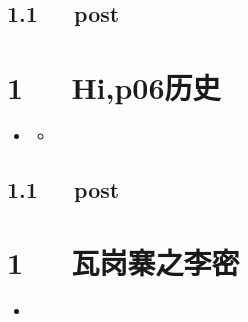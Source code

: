 \documentclass[letterpaper,12pt,english]{sphinxmanual}
\begin{document}
\section{1.1   post}
\label{\detokenize{p05_u6280_u672f/Hello_uff0cp05_u6280_u672f:post}}

\chapter{1   Hi,p06历史}
\label{\detokenize{p06_u5386_u53f2/Hello_uff0cp06_u5386_u53f2:hi-p06}}\label{\detokenize{p06_u5386_u53f2/Hello_uff0cp06_u5386_u53f2::doc}}
\begin{sphinxShadowBox}
\begin{itemize}
\item {} 
\label{\detokenize{p06_u5386_u53f2/Hello_uff0cp06_u5386_u53f2:id2}}{\hyperref[\detokenize{p06_u5386_u53f2/Hello_uff0cp06_u5386_u53f2:hi-p06}]{}}
\begin{itemize}
\item {} 
\label{\detokenize{p06_u5386_u53f2/Hello_uff0cp06_u5386_u53f2:id3}}{\hyperref[\detokenize{p06_u5386_u53f2/Hello_uff0cp06_u5386_u53f2:post}]{}}

\end{itemize}

\end{itemize}
\end{sphinxShadowBox}


\section{1.1   post}
\label{\detokenize{p06_u5386_u53f2/Hello_uff0cp06_u5386_u53f2:post}}

\chapter{1   瓦岗寨之李密}
\label{\detokenize{p06_u5386_u53f2/_u74e6_u5c97_u5be8_u4e4b_u674e_u5bc6:id1}}\label{\detokenize{p06_u5386_u53f2/_u74e6_u5c97_u5be8_u4e4b_u674e_u5bc6::doc}}
\begin{sphinxShadowBox}
\begin{itemize}
\item {} 
\label{\detokenize{p06_u5386_u53f2/_u74e6_u5c97_u5be8_u4e4b_u674e_u5bc6:id3}}{\hyperref[\detokenize{p06_u5386_u53f2/_u74e6_u5c97_u5be8_u4e4b_u674e_u5bc6:id1}]{}}

\end{itemize}
\end{sphinxShadowBox}
\end{document}
